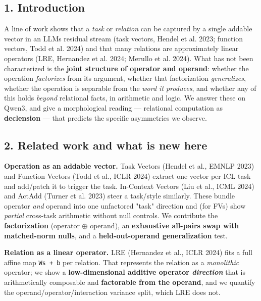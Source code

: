 \subsection{1. Introduction}\label{1-introduction}

A line of work shows that a \emph{task} or \emph{relation} can be
captured by a single addable vector in an LLM\textquotesingle s residual
stream (task vectors, Hendel et al. 2023; function vectors, Todd et al.
2024) and that many relations are approximately linear operators (LRE,
Hernandez et al. 2024; Merullo et al. 2024). What has not been
characterized is the \textbf{joint structure of operator and operand}:
whether the operation \emph{factorizes} from its argument, whether that
factorization \emph{generalizes}, whether the operation is separable
from the \emph{word it produces}, and whether any of this holds
\emph{beyond} relational facts, in arithmetic and logic. We answer these
on Qwen3, and give a morphological reading --- relational computation as
\textbf{declension} --- that predicts the specific asymmetries we
observe.

\subsection{2. Related work and what is new
here}\label{2-related-work-and-what-is-new-here}

\textbf{Operation as an addable vector.} Task Vectors (Hendel et al.,
EMNLP 2023) and Function Vectors (Todd et al., ICLR 2024) extract one
vector per ICL task and add/patch it to trigger the task. In-Context
Vectors (Liu et al., ICML 2024) and ActAdd (Turner et al. 2023) steer a
task/style similarly. These bundle operator \emph{and} operand into one
unfactored "task" direction and (for FVs) show \emph{partial} cross-task
arithmetic without null controls. We contribute the
\textbf{factorization} (operator \ensuremath{\oplus} operand), an \textbf{exhaustive
all-pairs swap with matched-norm nulls}, and a \textbf{held-out-operand
generalization} test.

\textbf{Relation as a linear operator.} LRE (Hernandez et al., ICLR
2024) fits a full affine map \texttt{W\textperiodcentered{}s\ +\ b} per relation. That
represents the relation as a \emph{monolithic} operator; we show a
\textbf{low-dimensional additive operator \emph{direction}} that is
arithmetically composable and \textbf{factorable from the operand}, and
we quantify the operand/operator/interaction variance split, which LRE
does not.

